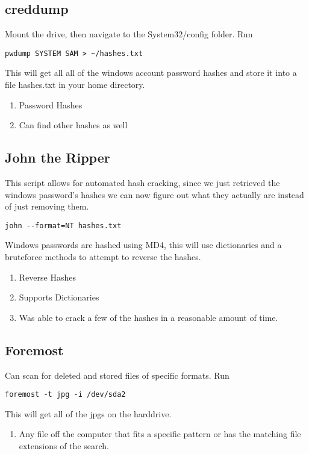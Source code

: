 \documentclass[a4paper, 11pt]{article}
\begin{document}
\subsection*{creddump}
Mount the drive, then navigate to the System32/config folder.  Run
\begin{lstlisting}
pwdump SYSTEM SAM > ~/hashes.txt
\end{lstlisting}
This will get all all of the windows account password hashes and store it into a file hashes.txt in your home directory.
\begin{enumerate}
\item Password Hashes
\item Can find other hashes as well
\end{enumerate}
\subsection*{John the Ripper}
This script allows for automated hash cracking, since we just retrieved the windows password's hashes we can now figure out what they actually are instead of just removing them.
\begin{lstlisting}
john --format=NT hashes.txt
\end{lstlisting}
Windows passwords are hashed using MD4, this will use dictionaries and a bruteforce methods to attempt to reverse the hashes.
\begin{enumerate}
\item Reverse Hashes
\item Supports Dictionaries
\item Was able to crack a few of the hashes in a reasonable amount of time.
\end{enumerate}
\subsection*{Foremost}
Can scan for deleted and stored files of specific formats.  Run
\begin{lstlisting}
foremost -t jpg -i /dev/sda2
\end{lstlisting}
This will get all of the jpgs on the harddrive.
\begin{enumerate}
\item Any file off the computer that fits a specific pattern or has the matching file extensions of the search.
\end{enumerate}
\end{document}
